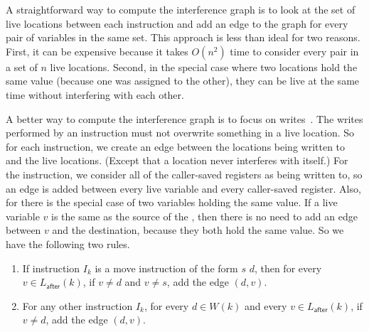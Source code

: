 \documentclass[7x10,nocrop]{TimesAPriori_MIT}%
\begin{document}
A straightforward way to compute the interference graph is to look at
the set of live locations between each instruction and add an edge to
the graph for every pair of variables in the same set.  This approach
is less than ideal for two reasons. First, it can be expensive because
it takes $O(n^2)$ time to consider every pair in a set of $n$ live
locations. Second, in the special case where two locations hold the
same value (because one was assigned to the other), they can be live
at the same time without interfering with each other.

A better way to compute the interference graph is to focus on
writes~\citep{Appel:2003fk}. The writes performed by an instruction
must not overwrite something in a live location. So for each
instruction, we create an edge between the locations being written to
and the live locations. (Except that a location never interferes with
itself.) For the  instruction, we consider all of the
caller-saved registers as being written to, so an edge is added
between every live variable and every caller-saved register. Also, for
 there is the special case of two variables holding the same
value. If a live variable $v$ is the same as the source of the
, then there is no need to add an edge between $v$ and the
destination, because they both hold the same value.
%
So we have the following two rules.

\begin{enumerate}
\item If instruction $I_k$ is a move instruction of the form
   $s$\key{,} $d$, then for every $v \in
  L_{\mathsf{after}}(k)$, if $v \neq d$ and $v \neq s$, add the edge
  $(d,v)$.

\item For any other instruction $I_k$, for every $d \in W(k)$ and
  every $v \in L_{\mathsf{after}}(k)$, if $v \neq d$, add the edge
  $(d,v)$.
\end{enumerate}
\end{document}
